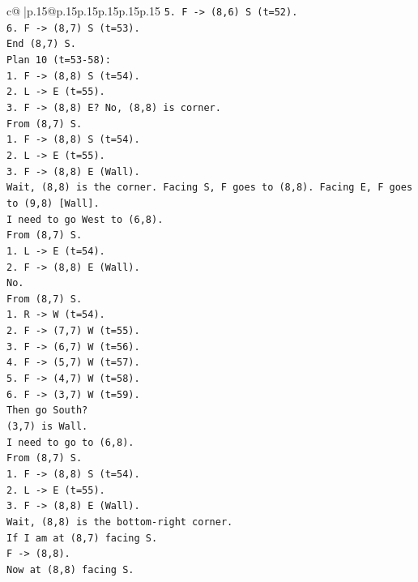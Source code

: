 \documentclass{article}
\begin{document}
{\begin{supertabular}{c@{$\;$}|p{.15\linewidth}@{}p{.15\linewidth}p{.15\linewidth}p{.15\linewidth}p{.15\linewidth}p{.15\linewidth}}
{{{\texttt{5. F {-}> (8,6) S (t=52).} \\
\texttt{6. F {-}> (8,7) S (t=53).} \\
\texttt{End (8,7) S.} \\
\texttt{Plan 10 (t=53{-}58):} \\
\texttt{1. F {-}> (8,8) S (t=54).} \\
\texttt{2. L {-}> E (t=55).} \\
\texttt{3. F {-}> (8,8) E? No, (8,8) is corner.} \\
\texttt{From (8,7) S.} \\
\texttt{1. F {-}> (8,8) S (t=54).} \\
\texttt{2. L {-}> E (t=55).} \\
\texttt{3. F {-}> (8,8) E (Wall).} \\
\texttt{Wait, (8,8) is the corner. Facing S, F goes to (8,8). Facing E, F goes to (9,8) {[}Wall{]}.} \\
\texttt{I need to go West to (6,8).} \\
\texttt{From (8,7) S.} \\
\texttt{1. L {-}> E (t=54).} \\
\texttt{2. F {-}> (8,8) E (Wall).} \\
\texttt{No.} \\
\texttt{From (8,7) S.} \\
\texttt{1. R {-}> W (t=54).} \\
\texttt{2. F {-}> (7,7) W (t=55).} \\
\texttt{3. F {-}> (6,7) W (t=56).} \\
\texttt{4. F {-}> (5,7) W (t=57).} \\
\texttt{5. F {-}> (4,7) W (t=58).} \\
\texttt{6. F {-}> (3,7) W (t=59).} \\
\texttt{Then go South?} \\
\texttt{(3,7) is Wall.} \\
\texttt{I need to go to (6,8).} \\
\texttt{From (8,7) S.} \\
\texttt{1. F {-}> (8,8) S (t=54).} \\
\texttt{2. L {-}> E (t=55).} \\
\texttt{3. F {-}> (8,8) E (Wall).} \\
\texttt{Wait, (8,8) is the bottom{-}right corner.} \\
\texttt{If I am at (8,7) facing S.} \\
\texttt{F {-}> (8,8).} \\
\texttt{Now at (8,8) facing S.} \\
}}}
\end{supertabular}}
\end{document}
